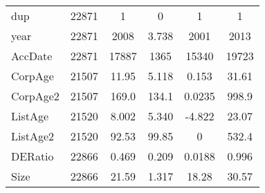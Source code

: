\documentclass[]{article}
\begin{document}
\begin{tabular}{lccccc}
dup & 22871 & 1 & 0 & 1 & 1 \\
year & 22871 & 2008 & 3.738 & 2001 & 2013 \\
AccDate & 22871 & 17887 & 1365 & 15340 & 19723 \\
CorpAge & 21507 & 11.95 & 5.118 & 0.153 & 31.61 \\
CorpAge2 & 21507 & 169.0 & 134.1 & 0.0235 & 998.9 \\
ListAge & 21520 & 8.002 & 5.340 & -4.822 & 23.07 \\
ListAge2 & 21520 & 92.53 & 99.85 & 0 & 532.4 \\
DERatio & 22866 & 0.469 & 0.209 & 0.0188 & 0.996 \\
 Size & 22866 & 21.59 & 1.317 & 18.28 & 30.57 \\ \hline
\end{tabular}
\end{document}
